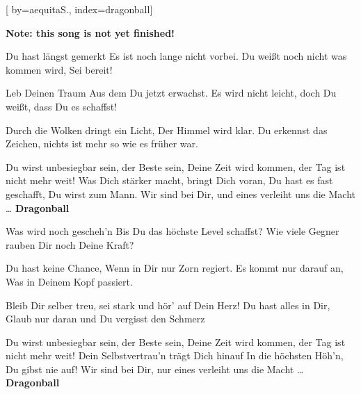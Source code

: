 
[%
    by={aequitaS.},
    index={dragonball}]


    \label{dragonball}

    \textbf{Note: this song is not yet finished!}

    \beginverse
        Du hast l\"{a}ngst gemerkt
        Es ist noch lange nicht vorbei.
        Du wei\ss{}t noch nicht was kommen wird,
        Sei bereit!

        Leb Deinen Traum
        Aus dem Du jetzt erwachst.
        Es wird nicht leicht,
        doch Du wei\ss{}t, dass Du es schaffst!
    \endverse

    \beginverse*
        Durch die Wolken dringt ein Licht,
        Der Himmel wird klar.
        Du erkennst das Zeichen,
        nichts ist mehr so wie es fr\"{u}her war.
    \endverse

    \beginchorus
        Du wirst unbesiegbar sein, der Beste sein,
        Deine Zeit wird kommen, der Tag ist nicht mehr weit!
        Was Dich st\"{a}rker macht, bringt Dich voran,
        Du hast es fast geschafft, Du wirst zum Mann.
        Wir sind bei Dir, und eines verleiht uns die Macht \ldots
        \textbf{Dragonball}
    \endchorus

    \beginverse
        Was wird noch gescheh'n
        Bis Du das h\"{o}chste Level schaffst?
        Wie viele Gegner rauben
        Dir noch Deine Kraft?

        Du hast keine Chance,
        Wenn in Dir nur Zorn regiert.
        Es kommt nur darauf an,
        Was in Deinem Kopf passiert.
    \endverse

    \beginverse*
        Bleib Dir selber treu, sei stark
        und h\"{o}r' auf Dein Herz!
        Du hast alles in Dir,
        Glaub nur daran und Du vergisst den Schmerz
    \endverse

    \beginchorus
        Du wirst unbesiegbar sein, der Beste sein,
        Deine Zeit wird kommen, der Tag ist nicht mehr weit!
        Dein Selbstvertrau'n tr\"{a}gt Dich hinauf
        In die h\"{o}chsten H\"{o}h'n, Du gibst nie auf!
        Wir sind bei Dir, nur eines verleiht uns die Macht \ldots
        \textbf{Dragonball}
    \endchorus
\endsong
